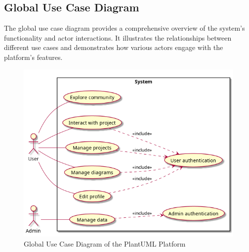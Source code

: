 \subsection{Global Use Case Diagram}

The global use case diagram provides a comprehensive overview of the system's functionality and actor interactions. It illustrates the relationships between different use cases and demonstrates how various actors engage with the platform's features.

\begin{figure}[H]
    \centering
    \includegraphics[width=\textwidth]{./diagrams/use_case/g1.png}
    \caption{Global Use Case Diagram of the PlantUML Platform}
    \label{fig:global_use_case}
\end{figure}


